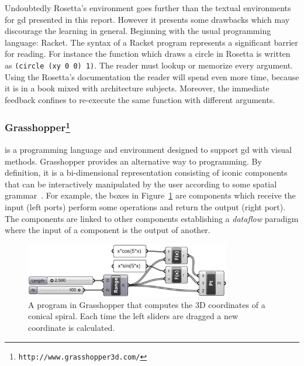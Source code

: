 Undoubtedly Rosetta's environment goes further than the textual environments for \ac{gd} presented in this report. However it presents some drawbacks which may discourage the learning in general. Beginning with the usual programming language: Racket. The syntax of a Racket program represents a significant barrier for reading. For instance the function which draws a circle in Rosetta is written as \texttt{(circle (xy 0 0) 1)}. The reader must lookup or memorize every argument. Using the Rosetta's documentation the reader will spend even more time, because it is in a book mixed with architecture subjects. Moreover, the immediate feedback confines to re-execute the same function with different arguments.
\subsubsection{Grasshopper\protect\footnote{\texttt{http://www.grasshopper3d.com/}}} is a programming language and environment designed to support \ac{gd} with visual methods. Grasshopper provides an alternative way to programming. By definition, it is a bi-dimensional representation consisting of iconic components that can be interactively manipulated by the user according to some spatial grammar~\cite{myers1990taxonomies}. For example, the boxes in Figure~\ref{fig:grass} are components which receive the input (left ports) perform some operations and return the output (right port). The components are linked to other components establishing a \textit{dataflow} paradigm where the input of a component is the output of another.

\begin{figure}[!htbp]
\vspace{-5pt}
  \centering
  \includegraphics[width=0.8\textwidth]{img/grasshopper}
  \vspace{-5pt}
    \caption{A program in Grasshopper that computes the 3D coordinates of a conical spiral. Each time the left sliders are dragged a new coordinate is calculated.}
  \label{fig:grass}
  \vspace{-10pt}
\end{figure}

